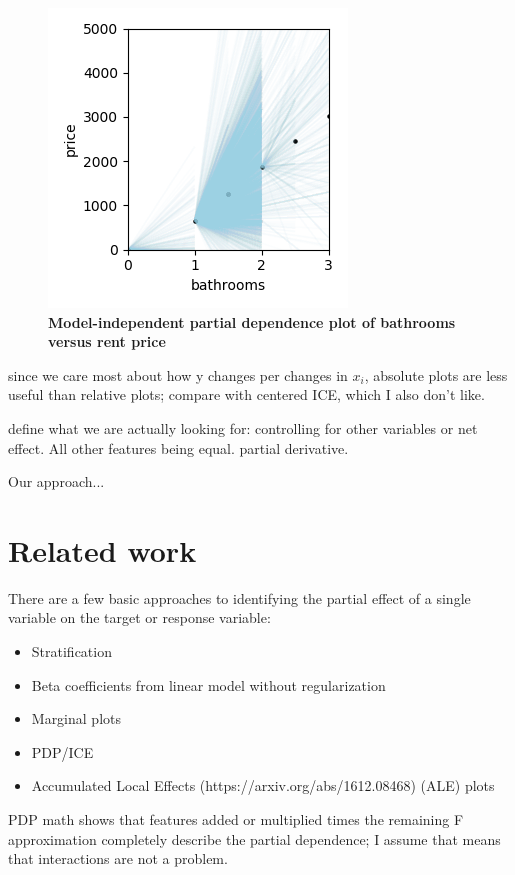 \documentclass[12pt]{article}
\begin{document}
\begin{figure}[htbp]
\begin{center}
\includegraphics[scale=0.7]{images/baths_vs_price_mipd.png}
\caption{{\bf  Model-independent partial dependence plot of bathrooms versus rent price}}
\label{fig:baths_price_mipd}
\end{center}
\end{figure}

since we care most about how y changes per changes in $x_i$, absolute plots are less useful than relative plots; compare with centered ICE, which I also don't like.

define what we are actually looking for: controlling for other variables or net effect. All other features being equal. partial derivative.

Our approach...

\section{Related work}

There are a few basic approaches to identifying the partial effect of a single variable on the target or response variable:

\begin{itemize}
\item Stratification
\item Beta coefficients from linear model without regularization
\item Marginal plots
\item PDP/ICE
\item Accumulated Local Effects (https://arxiv.org/abs/1612.08468) (ALE) plots
\end{itemize}

PDP math shows that features added or multiplied times the remaining F approximation completely describe the partial dependence; I assume that means that interactions are not a problem.
\end{document}
